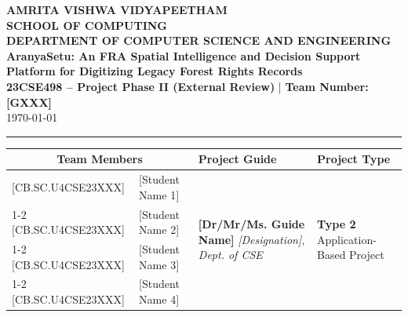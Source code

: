 \documentclass[11pt, a4paper]{article}
\begin{document}
\noindent
\begin{minipage}{\textwidth}
    \centering
    {\Large \textbf{\textcolor{amritaMaroon}{
    AMRITA VISHWA VIDYAPEETHAM \\
    SCHOOL OF COMPUTING \\
    DEPARTMENT OF COMPUTER SCIENCE AND ENGINEERING \\
    }}}
    \vspace{0.2cm}
    {\large \textbf{AranyaSetu: An FRA Spatial Intelligence and Decision Support Platform for Digitizing Legacy Forest Rights Records}} \\[0.1cm]
    \textbf{23CSE498 -- Project Phase II (External Review)} \quad | \quad \textbf{Team Number: [GXXX]} \\
    \today
\end{minipage}

\vspace{0.3cm}
\hrule
\vspace{0.3cm}

\noindent
\begin{center}
    \renewcommand{\arraystretch}{1.45}
    \setlength{\tabcolsep}{6pt}
    \begin{tabular}{|l|p{4.8cm}|p{4.6cm}|p{3.2cm}|}
        \hline
        \multicolumn{2}{|c|}{\textbf{Team Members}} & \textbf{Project Guide} & \textbf{Project Type} \\
        \hline
        \small [CB.SC.U4CSE23XXX] & \small \raggedright [Student Name 1] &
        \multirow{4}{=}{\raggedright \small \textbf{[Dr/Mr/Ms. Guide Name]} \newline \textit{[Designation], \newline Dept. of CSE}} &
        \multirow{4}{=}{\raggedright \small \textbf{Type 2} \newline Application-Based Project} \\ \cline{1-2}
        \small [CB.SC.U4CSE23XXX] & \small [Student Name 2] & & \\ \cline{1-2}
        \small [CB.SC.U4CSE23XXX] & \small [Student Name 3] & & \\ \cline{1-2}
        \small [CB.SC.U4CSE23XXX] & \small [Student Name 4] & & \\
        \hline
    \end{tabular}
\end{center}
\vspace{0.2cm}
\end{document}
